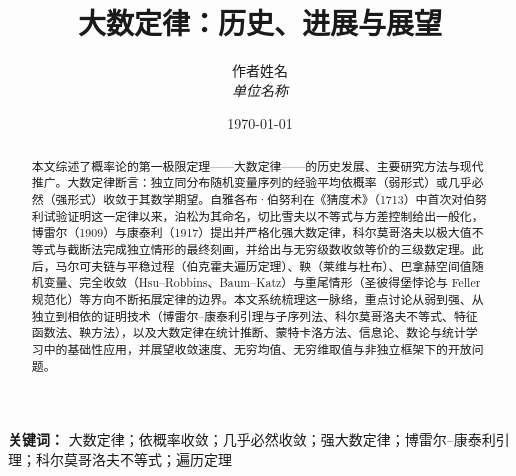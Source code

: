 \documentclass[12pt,a4paper]{article}
\title{大数定律：历史、进展与展望}
\author{
    作者姓名\\
    \textit{单位名称}
}
\date{\today}
\numberwithin{equation}{section}
\begin{document}
\maketitle

\begin{abstract}
    本文综述了概率论的第一极限定理——大数定律——的历史发展、主要研究方法与现代推广。大数定律断言：独立同分布随机变量序列的经验平均依概率（弱形式）或几乎必然（强形式）收敛于其数学期望。自雅各布·伯努利在《猜度术》（1713）中首次对伯努利试验证明这一定律以来，泊松为其命名，切比雪夫以不等式与方差控制给出一般化，博雷尔（1909）与康泰利（1917）提出并严格化强大数定律，科尔莫哥洛夫以极大值不等式与截断法完成独立情形的最终刻画，并给出与无穷级数收敛等价的三级数定理。此后，马尔可夫链与平稳过程（伯克霍夫遍历定理）、鞅（莱维与杜布）、巴拿赫空间值随机变量、完全收敛（Hsu--Robbins、Baum--Katz）与重尾情形（圣彼得堡悖论与 Feller 规范化）等方向不断拓展定律的边界。本文系统梳理这一脉络，重点讨论从弱到强、从独立到相依的证明技术（博雷尔--康泰利引理与子序列法、科尔莫哥洛夫不等式、特征函数法、鞅方法），以及大数定律在统计推断、蒙特卡洛方法、信息论、数论与统计学习中的基础性应用，并展望收敛速度、无穷均值、无穷维取值与非独立框架下的开放问题。
\end{abstract}

\textbf{关键词：} 大数定律；依概率收敛；几乎必然收敛；强大数定律；博雷尔--康泰利引理；科尔莫哥洛夫不等式；遍历定理

\tableofcontents
\newpage












\appendix

\end{document}
